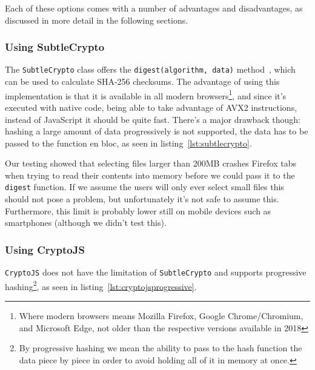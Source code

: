 Each of these options comes with a number of advantages and disadvantages, as discussed in more detail in the following sections.

\subsubsection{Using SubtleCrypto}
\label{subsec:subtlecrypto}
The \texttt{SubtleCrypto} class offers the \texttt{digest(algorithm, data)} method~\cite{subtlecrypto}, which can be used to
calculate \gls{SHA-256} checksums.
The advantage of using this implementation is that it is available in all modern browsers\footnote{Where modern browsers means Mozilla Firefox, Google Chrome/Chromium, and Microsoft Edge, not older than the respective versions available in 2018},
and since it's executed with native code, being able to take advantage of \gls{AVX2} instructions, instead of JavaScript it should be quite fast.
There's a major drawback though: hashing a large amount of data progressively is not supported, the data has to be
passed to the function en bloc, as seen in listing~\ref{lst:subtlecrypto}.



Our testing showed that selecting files larger than 200MB crashes Firefox tabs when trying to read their contents
into memory before we could pass it to the \texttt{digest} function.
If we assume the users will only ever select small files this should not pose a problem, but unfortunately it's not safe to assume this.
Furthermore, this limit is probably lower still on mobile devices such as smartphones (although we didn't test this).

\subsubsection{Using CryptoJS}
\label{subsec:cryptojs}
\texttt{CryptoJS} does not have the limitation of \texttt{SubtleCrypto} and supports progressive hashing\footnote{
By progressive hashing we mean the ability to pass to the hash function the data piece by piece in order to avoid holding all of it in memory at once.},
as seen in listing~\ref{lst:cryptojsprogressive}.



